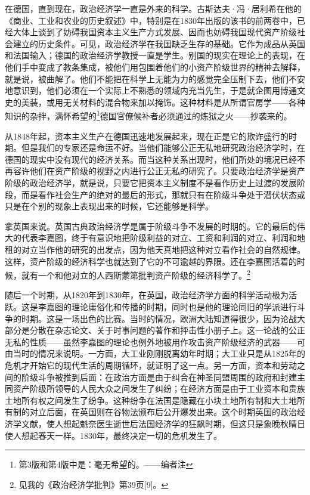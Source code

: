 \documentclass{ctexbook}
\begin{document}
在德国，直到现在，政治经济学一直是外来的科学。古斯达夫·冯·居利希在他的《商业、工业和农业的历史叙述》中，特别是在1830年出版的该书的前两卷中，已经大体上谈到了妨碍我国资本主义生产方式发展、因而也妨碍我国现代资产阶级社会建立的历史条件。可见，政治经济学在我国缺乏生存的基础。它作为成品从英国和法国输入；德国的政治经济学教授一直是学生。别国的现实在理论上的表现，在他们手中变成了教条集成，被他们用包围着他们的小资产阶级世界的精神去解释，就是说，被曲解了。他们不能把在科学上无能为力的感觉完全压制下去，他们不安地意识到，他们必须在一个实际上不熟悉的领域内充当先生，于是就企图用博通文史的美装，或用无关材料的混合物来加以掩饰。这种材料是从所谓官房学——各种知识的杂拌，满怀希望的\footnote{第3版和第4版中是：毫无希望的。——编者注}德国官僚候补者必须通过的炼狱之火——抄袭来的。

从1848年起，资本主义生产在德国迅速地发展起来，现在正是它的欺诈盛行的时期。但是我们的专家还是命运不好。当他们能够公正无私地研究政治经济学时，在德国的现实中没有现代的经济关系。而当这种关系出现时，他们所处的境况已经不再容许他们在资产阶级的视野之内进行公正无私的研究了。只要政治经济学是资产阶级的政治经济学，就是说，只要它把资本主义制度不是看作历史上过渡的发展阶段，而是看作社会生产的绝对的最后的形式，那就只有在阶级斗争处于潜伏状态或只是在个别的现象上表现出来的时候，它还能够是科学。

拿英国来说。英国古典政治经济学是属于阶级斗争不发展的时期的。它的最后的伟大的代表李嘉图，终于有意识地把阶级利益的对立、工资和利润的对立、利润和地租的对立当作他的研究的出发点，因为他天真地把这种对立看作社会的自然规律。这样，资产阶级的经济科学也就达到了它的不可逾越的界限。还在李嘉图活着的时候，就有一个和他对立的人西斯蒙第批判资产阶级的经济科学了。\footnote{见我的《政治经济学批判》第39页[9]。}

随后一个时期，从1820年到1830年，在英国，政治经济学方面的科学活动极为活跃。这是李嘉图的理论庸俗化和传播的时期，同时也是他的理论同旧的学派进行斗争的时期。这是一场出色的比赛。当时的情况，欧洲大陆知道得很少，因为论战大部分是分散在杂志论文、关于时事问题的著作和抨击性小册子上。这一论战的公正无私的性质——虽然李嘉图的理论也例外地被用作攻击资产阶级经济的武器——可由当时的情况来说明。一方面，大工业刚刚脱离幼年时期；大工业只是从1825年的危机才开始它的现代生活的周期循环，就证明了这一点。另一方面，资本和劳动之间的阶级斗争被推到后面：在政治方面是由于纠合在神圣同盟周围的政府和封建主同资产阶级所领导的人民大众之间发生了纠纷；在经济方面是由于工业资本和贵族土地所有权之间发生了纷争。这种纷争在法国是隐藏在小块土地所有制和大土地所有制的对立后面，在英国则在谷物法颁布后公开爆发出来。这个时期英国的政治经济学文献，使人想起魁奈医生逝世后法国经济学的狂飙时期，但这只是象晚秋晴日使人想起春天一样。1830年，最终决定一切的危机发生了。
\end{document}
